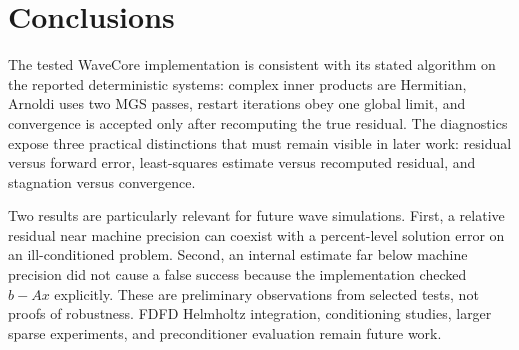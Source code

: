 \section{Conclusions}

The tested WaveCore implementation is consistent with its stated algorithm on the
reported deterministic systems: complex inner products are Hermitian, Arnoldi
uses two MGS passes, restart iterations obey one global limit, and convergence is
accepted only after recomputing the true residual. The diagnostics expose three
practical distinctions that must remain visible in later work: residual versus
forward error, least-squares estimate versus recomputed residual, and stagnation
versus convergence.

Two results are particularly relevant for future wave simulations. First, a
relative residual near machine precision can coexist with a percent-level
solution error on an ill-conditioned problem. Second, an internal estimate far
below machine precision did not cause a false success because the implementation
checked $b-Ax$ explicitly. These are preliminary observations from selected
tests, not proofs of robustness. FDFD Helmholtz integration, conditioning studies,
larger sparse experiments, and preconditioner evaluation remain future work.

